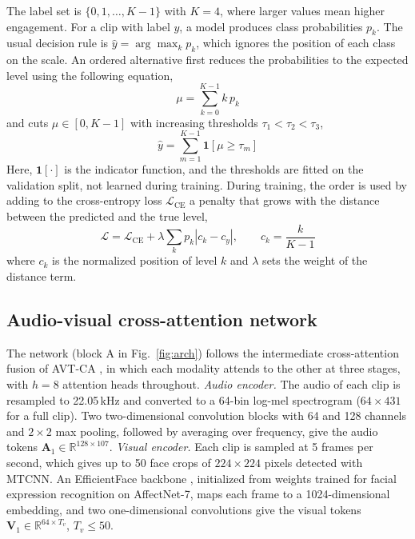 \documentclass[pdflatex,iicol,sn-basic]{sn-jnl}
\begin{document}
The label set is $\{0, 1, \ldots, K-1\}$ with $K = 4$, where larger values mean higher engagement. For a clip with label $y$, a model produces class probabilities $p_k$. The usual decision rule is $\hat{y} = \arg\max_{k} p_k$, which ignores the position of each class on the scale. An ordered alternative first reduces the probabilities to the expected level using the following equation,
\begin{equation}
\mu = \sum_{k=0}^{K-1} k \, p_k \label{eq:mu}
\end{equation}
and cuts $\mu \in [0, K-1]$ with increasing thresholds $\tau_1 < \tau_2 < \tau_3$,
\begin{equation}
\hat{y} = \sum_{m=1}^{K-1} \mathbf{1}\!\left[\mu \geq \tau_m\right] \label{eq:thresh}
\end{equation}
Here, $\mathbf{1}[\cdot]$ is the indicator function, and the thresholds are fitted on the validation split, not learned during training. During training, the order is used by adding to the cross-entropy loss $\mathcal{L}_{\mathrm{CE}}$ a penalty that grows with the distance between the predicted and the true level,
\begin{equation}
\mathcal{L} = \mathcal{L}_{\mathrm{CE}} + \lambda \sum_{k} p_k \left| c_k - c_y \right|, \qquad c_k = \frac{k}{K-1} \label{eq:loss}
\end{equation}
where $c_k$ is the normalized position of level $k$ and $\lambda$ sets the weight of the distance term.

\subsection{Audio-visual cross-attention network}\label{sec:method_av}

The network (block A in Fig.~\ref{fig:arch}) follows the intermediate cross-attention fusion of AVT-CA \citep{venkatraman2025avtca}, in which each modality attends to the other at three stages, with $h = 8$ attention heads throughout. \emph{Audio encoder.} The audio of each clip is resampled to 22.05\,kHz and converted to a 64-bin log-mel spectrogram ($64 \times 431$ for a full clip). Two two-dimensional convolution blocks with 64 and 128 channels and $2 \times 2$ max pooling, followed by averaging over frequency, give the audio tokens $\mathbf{A}_1 \in \mathbb{R}^{128 \times 107}$. \emph{Visual encoder.} Each clip is sampled at 5 frames per second, which gives up to 50 face crops of $224 \times 224$ pixels detected with MTCNN. An EfficientFace backbone \citep{zhao2021efficientface}, initialized from weights trained for facial expression recognition on AffectNet-7, maps each frame to a 1024-dimensional embedding, and two one-dimensional convolutions give the visual tokens $\mathbf{V}_1 \in \mathbb{R}^{64 \times T_v}$, $T_v \le 50$.
\end{document}

